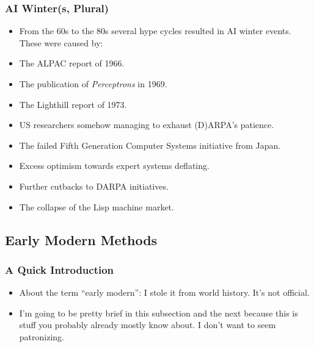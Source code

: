 \documentclass[10pt]{beamer}
\begin{document}
  \begin{frame}
    \frametitle{AI Winter(s, Plural)}

    \begin{itemize}
      \item From the 60s to the 80s several hype cycles resulted in AI winter
        events. These were caused by:
      \pause
      \item The ALPAC report of 1966.
      \pause
      \item The publication of \textit{Perceptrons} in 1969.
      \pause
      \item The Lighthill report of 1973.
      \pause
      \item US researchers somehow managing to exhaust (D)ARPA's patience.
      \pause
      \item The failed Fifth Generation Computer Systems initiative from
        Japan.
      \pause
      \item Excess optimism towards expert systems deflating.
      \pause
      \item Further cutbacks to DARPA initiatives.
      \pause
      \item The collapse of the Lisp machine market.
    \end{itemize}
  \end{frame}

  \subsection{Early Modern Methods}

  \begin{frame}
    \frametitle{A Quick Introduction}

    \begin{itemize}
      \item About the term ``early modern'': I stole it from world history.
        It's not official.
      \pause
      \item I'm going to be pretty brief in this subsection and the next
        because this is stuff you probably already mostly know about. I don't
        want to seem patronizing.
    \end{itemize}
  \end{frame}
\end{document}
